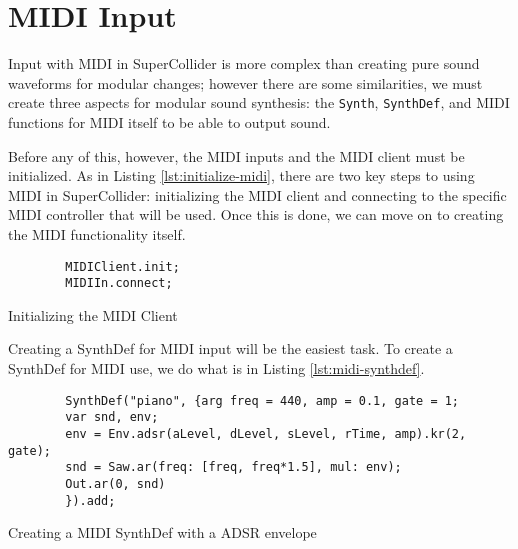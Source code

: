 \section{MIDI Input}\label{section:midi-input}

Input with MIDI in SuperCollider is more complex than creating pure sound waveforms for modular changes; however there are some similarities, we must create three aspects for modular sound synthesis: the \texttt{Synth}, \texttt{SynthDef}, and MIDI functions for MIDI itself to be able to output sound. 

Before any of this, however, the MIDI inputs and the MIDI client must be initialized. As in Listing \ref{lst:initialize-midi}, there are two key steps to using MIDI in SuperCollider: initializing the MIDI client and connecting to the specific MIDI controller that will be used. Once this is done, we can move on to creating the MIDI functionality itself.

\begin{listing}
	\begin{lstlisting}
		MIDIClient.init;
		MIDIIn.connect;
	\end{lstlisting}
	\caption{Initializing the MIDI Client}
	\label{lst:initialize-midi}
\end{listing}

Creating a SynthDef for MIDI input will be the easiest task. To create a SynthDef for MIDI use, we do what is in Listing \ref{lst:midi-synthdef}. 

\begin{listing}
	\begin{lstlisting}
		SynthDef("piano", {arg freq = 440, amp = 0.1, gate = 1;
		var snd, env;
		env = Env.adsr(aLevel, dLevel, sLevel, rTime, amp).kr(2, gate);
		snd = Saw.ar(freq: [freq, freq*1.5], mul: env);
		Out.ar(0, snd)
		}).add;
	\end{lstlisting}
	\caption{Creating a MIDI SynthDef with a ADSR envelope}
	\label{lst:midi-synthdef}	
\end{listing}

